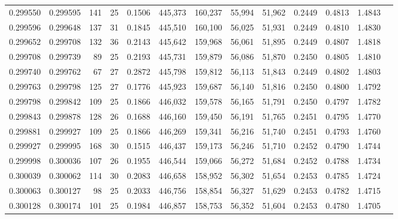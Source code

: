 \begin{tabular}{rrrrrrrrrrrrr}
0.299550 & 0.299595 &   141 &  25 &                                     0.1506 & 445,373 & 160,237 &  55,994 &  51,962 & 0.2449 & 0.4813 & 1.4843 \\
0.299596 & 0.299648 &   137 &  31 &                                     0.1845 & 445,510 & 160,100 &  56,025 &  51,931 & 0.2449 & 0.4810 & 1.4830 \\
0.299652 & 0.299708 &   132 &  36 &                                     0.2143 & 445,642 & 159,968 &  56,061 &  51,895 & 0.2449 & 0.4807 & 1.4818 \\
0.299708 & 0.299739 &    89 &  25 &                                     0.2193 & 445,731 & 159,879 &  56,086 &  51,870 & 0.2450 & 0.4805 & 1.4810 \\
0.299740 & 0.299762 &    67 &  27 &                                     0.2872 & 445,798 & 159,812 &  56,113 &  51,843 & 0.2449 & 0.4802 & 1.4803 \\
0.299763 & 0.299798 &   125 &  27 &                                     0.1776 & 445,923 & 159,687 &  56,140 &  51,816 & 0.2450 & 0.4800 & 1.4792 \\
0.299798 & 0.299842 &   109 &  25 &                                     0.1866 & 446,032 & 159,578 &  56,165 &  51,791 & 0.2450 & 0.4797 & 1.4782 \\
0.299843 & 0.299878 &   128 &  26 &                                     0.1688 & 446,160 & 159,450 &  56,191 &  51,765 & 0.2451 & 0.4795 & 1.4770 \\
0.299881 & 0.299927 &   109 &  25 &                                     0.1866 & 446,269 & 159,341 &  56,216 &  51,740 & 0.2451 & 0.4793 & 1.4760 \\
0.299927 & 0.299995 &   168 &  30 &                                     0.1515 & 446,437 & 159,173 &  56,246 &  51,710 & 0.2452 & 0.4790 & 1.4744 \\
0.299998 & 0.300036 &   107 &  26 &                                     0.1955 & 446,544 & 159,066 &  56,272 &  51,684 & 0.2452 & 0.4788 & 1.4734 \\
0.300039 & 0.300062 &   114 &  30 &                                     0.2083 & 446,658 & 158,952 &  56,302 &  51,654 & 0.2453 & 0.4785 & 1.4724 \\
0.300063 & 0.300127 &    98 &  25 &                                     0.2033 & 446,756 & 158,854 &  56,327 &  51,629 & 0.2453 & 0.4782 & 1.4715 \\
0.300128 & 0.300174 &   101 &  25 &                                     0.1984 & 446,857 & 158,753 &  56,352 &  51,604 & 0.2453 & 0.4780 & 1.4705 \\

\end{tabular}
